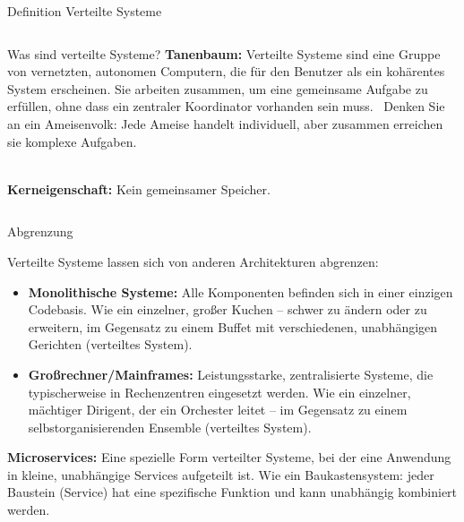 \documentclass{beamer}
\begin{document}
\begin{frame}{Definition Verteilte Systeme}

    \begin{columns}[c] %

        \begin{column}{1.0\textwidth} %
            \begin{block}{Was sind verteilte Systeme?}
                \textbf{Tanenbaum:} Verteilte Systeme sind eine Gruppe von vernetzten, autonomen Computern, die für den Benutzer als ein kohärentes System erscheinen. Sie arbeiten zusammen, um eine gemeinsame Aufgabe zu erfüllen, ohne dass ein zentraler Koordinator vorhanden sein muss.  Denken Sie an ein Ameisenvolk: Jede Ameise handelt individuell, aber zusammen erreichen sie komplexe Aufgaben.
            \end{block}
            \mbox{}\\
            \textbf{Kerneigenschaft:} Kein gemeinsamer Speicher.
        \end{column}
   \end{columns}

\end{frame}

\begin{frame}{Abgrenzung}

    Verteilte Systeme lassen sich von anderen Architekturen abgrenzen:

    \begin{itemize}
        \item \textbf{Monolithische Systeme:}  Alle Komponenten befinden sich in einer einzigen Codebasis.  Wie ein einzelner, großer Kuchen – schwer zu ändern oder zu erweitern, im Gegensatz zu einem Buffet mit verschiedenen, unabhängigen Gerichten (verteiltes System).
        \item \textbf{Großrechner/Mainframes:} Leistungsstarke, zentralisierte Systeme, die typischerweise in Rechenzentren eingesetzt werden. Wie ein einzelner, mächtiger Dirigent, der ein Orchester leitet – im Gegensatz zu einem selbstorganisierenden Ensemble (verteiltes System).
    \end{itemize}
  \textbf{Microservices:} Eine spezielle Form verteilter Systeme, bei der eine Anwendung in kleine, unabhängige Services aufgeteilt ist. Wie ein Baukastensystem: jeder Baustein (Service) hat eine spezifische Funktion und kann unabhängig kombiniert werden.
\end{frame}
\end{document}
